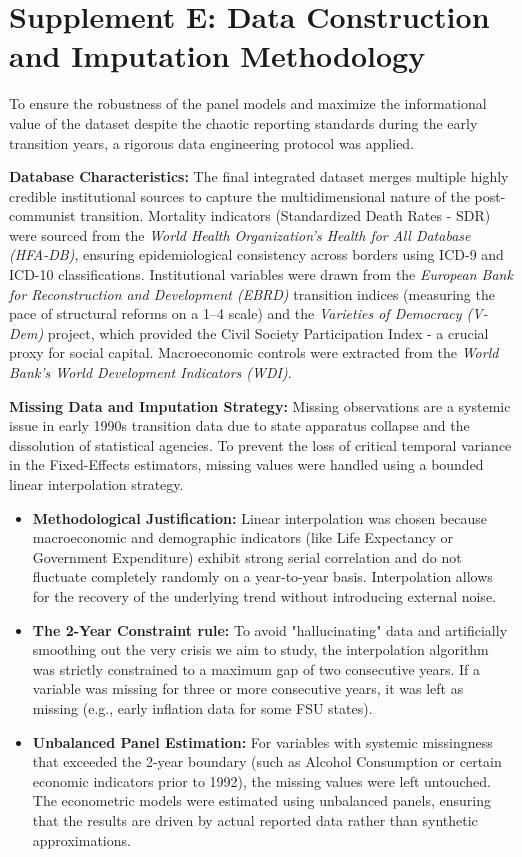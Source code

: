 \documentclass[en,magisterska]{pracamgr}
\begin{document}
\section*{Supplement E: Data Construction and Imputation Methodology}
To ensure the robustness of the panel models and maximize the informational value of the dataset despite the chaotic reporting standards during the early transition years, a rigorous data engineering protocol was applied. 

\textbf{Database Characteristics:} The final integrated dataset merges multiple highly credible institutional sources to capture the multidimensional nature of the post-communist transition. Mortality indicators (Standardized Death Rates - SDR) were sourced from the \textit{World Health Organization’s Health for All Database (HFA-DB)}, ensuring epidemiological consistency across borders using ICD-9 and ICD-10 classifications. Institutional variables were drawn from the \textit{European Bank for Reconstruction and Development (EBRD)} transition indices (measuring the pace of structural reforms on a 1--4 scale) and the \textit{Varieties of Democracy (V-Dem)} project, which provided the Civil Society Participation Index - a crucial proxy for social capital. Macroeconomic controls were extracted from the \textit{World Bank's World Development Indicators (WDI)}.

\textbf{Missing Data and Imputation Strategy:} Missing observations are a systemic issue in early 1990s transition data due to state apparatus collapse and the dissolution of statistical agencies. To prevent the loss of critical temporal variance in the Fixed-Effects estimators, missing values were handled using a bounded linear interpolation strategy.
\begin{itemize}
    \item \textbf{Methodological Justification:} Linear interpolation was chosen because macroeconomic and demographic indicators (like Life Expectancy or Government Expenditure) exhibit strong serial correlation and do not fluctuate completely randomly on a year-to-year basis. Interpolation allows for the recovery of the underlying trend without introducing external noise.
    \item \textbf{The 2-Year Constraint rule:} To avoid "hallucinating" data and artificially smoothing out the very crisis we aim to study, the interpolation algorithm was strictly constrained to a maximum gap of two consecutive years. If a variable was missing for three or more consecutive years, it was left as missing (e.g., early inflation data for some FSU states).
    \item \textbf{Unbalanced Panel Estimation:} For variables with systemic missingness that exceeded the 2-year boundary (such as Alcohol Consumption or certain economic indicators prior to 1992), the missing values were left untouched. The econometric models were estimated using unbalanced panels, ensuring that the results are driven by actual reported data rather than synthetic approximations.
\end{itemize}
\end{document}
